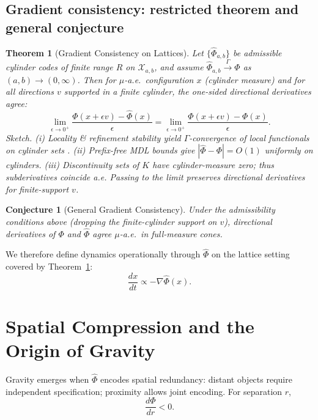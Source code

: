\documentclass[aps,preprint,onecolumn,longbibliography,nofootinbib]{revtex4-2}
\numberwithin{equation}{section}        %
\newtheorem{theorem}{Theorem}
\newtheorem{conjecture}{Conjecture}
\begin{document}
\subsection{Gradient consistency: restricted theorem and general conjecture}
\begin{theorem}[Gradient Consistency on Lattices]\label{thm:lattice}
Let $\{\widehat\Phi_{a,b}\}$ be admissible cylinder codes of finite range $R$ on $\mathcal X_{a,b}$, and assume $\widehat\Phi_{a,b}\xrightarrow{\Gamma}\widehat\Phi$ as $(a,b)\to (0,\infty)$. Then for $\mu$-a.e.\ configuration $x$ (cylinder measure) and for all directions $v$ supported in a finite cylinder, the one-sided directional derivatives agree:
\begin{equation}
\lim_{\epsilon\to 0^+}\frac{\widehat\Phi(x+\epsilon v)-\widehat\Phi(x)}{\epsilon} = \lim_{\epsilon\to 0^+}\frac{\Phi(x+\epsilon v)-\Phi(x)}{\epsilon}.
\end{equation}
\emph{Sketch.} (i) Locality \& refinement stability yield $\Gamma$-convergence of local functionals on cylinder sets \cite{Braides2002}. (ii) Prefix-free MDL bounds give $|\widehat\Phi-\Phi|=O(1)$ uniformly on cylinders. (iii) Discontinuity sets of $K$ have cylinder-measure zero; thus subderivatives coincide a.e. Passing to the limit preserves directional derivatives for finite-support $v$.
\end{theorem}

\begin{conjecture}[General Gradient Consistency]\label{conj:general}
Under the admissibility conditions above (dropping the finite-cylinder support on $v$), directional derivatives of $\Phi$ and $\widehat\Phi$ agree $\mu$-a.e.\ in full-measure cones.
\end{conjecture}

\noindent We therefore define dynamics operationally through $\widehat\Phi$ on the lattice setting covered by Theorem~\ref{thm:lattice}:
\begin{equation}
\frac{dx}{dt} \propto -\nabla \widehat\Phi(x). \label{eq:dynamics}
\end{equation}

\section{Spatial Compression and the Origin of Gravity}
Gravity emerges when $\widehat\Phi$ encodes spatial redundancy: distant objects require independent specification; proximity allows joint encoding. For separation $r$,
\begin{equation}
\frac{d\Phi}{dr} < 0. \label{eq:dphidr}
\end{equation}
\end{document}
